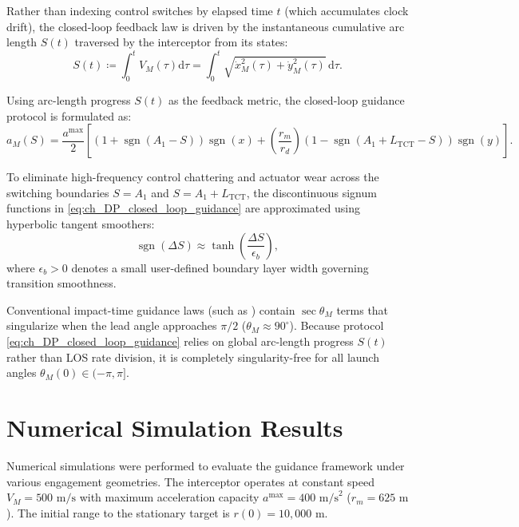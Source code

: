 Rather than indexing control switches by elapsed time $t$ (which accumulates clock drift), the closed-loop feedback law is driven by the instantaneous cumulative arc length $S(t)$ traversed by the interceptor from its states:
\begin{equation}\label{eq:ch_DP_arc_length_state}
    S(t) \coloneqq \int_0^t V_M(\tau) \mathrm{d}\tau = \int_0^t \sqrt{\dot{x}_M^2(\tau) + \dot{y}_M^2(\tau)} \, \mathrm{d}\tau.
\end{equation}

Using arc-length progress $S(t)$ as the feedback metric, the closed-loop guidance protocol is formulated as:
\begin{equation}\label{eq:ch_DP_closed_loop_guidance}
	a_M(S) = \frac{a^{\max}}{2} \left[ \left( 1 + \operatorname{sgn}(A_1 - S) \right) \operatorname{sgn}(x) + \left( \frac{r_m}{r_d} \right) \left( 1 - \operatorname{sgn}(A_1 + L_{\text{TCT}} - S) \right) \operatorname{sgn}(y) \right].
\end{equation}

To eliminate high-frequency control chattering and actuator wear across the switching boundaries $S = A_1$ and $S = A_1 + L_{\text{TCT}}$, the discontinuous signum functions in \eqref{eq:ch_DP_closed_loop_guidance} are approximated using hyperbolic tangent smoothers:
\begin{equation}\label{eq:ch_DP_sigmoid_smoothing}
	\operatorname{sgn}(\Delta S) \approx \tanh\left( \frac{\Delta S}{\epsilon_b} \right),
\end{equation}
where $\epsilon_b > 0$ denotes a small user-defined boundary layer width governing transition smoothness.

\begin{remark}\label{rem:ch_DP_singularity_free}
\leavevmode\par\noindent
Conventional impact-time guidance laws (such as \cite{harl2011impact}) contain $\sec \theta_M$ terms that singularize when the lead angle approaches $\pi/2$ ($\theta_M \approx 90^\circ$). Because protocol \eqref{eq:ch_DP_closed_loop_guidance} relies on global arc-length progress $S(t)$ rather than LOS rate division, it is completely singularity-free for all launch angles $\theta_M(0) \in (-\pi, \pi]$.
\end{remark}

\section{Numerical Simulation Results}\label{sec:ch_DP_simulations}
Numerical simulations were performed to evaluate the guidance framework under various engagement geometries. The interceptor operates at constant speed $V_M = 500\text{ m/s}$ with maximum acceleration capacity $a^{\max} = 400\text{ m/s}^2$ ($r_m = 625\text{ m}$). The initial range to the stationary target is $r(0) = 10,000\text{ m}$.

